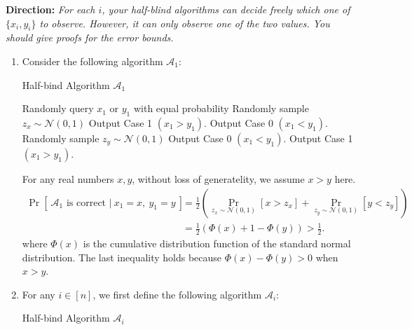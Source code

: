 \textbf{Direction:} \textit{For each $i$, your half-blind algorithms can decide freely which one of $\{x_i, y_i\}$ to observe. However, it can only observe one of the two values. You should give proofs for the error bounds.}

\newpage
\begin{answer}
\begin{enumerate}[label=\alph*).]
    \item Consider the following algorithm $\mathcal{A}_1$:
    \begin{algo}
        \caption{Half-bind Algorithm $\mathcal{A}_1$}
        \label{alg:half-blind-1}
        \begin{algorithmic}[1]
            \State Randomly query $x_1$ or $y_1$ with equal probability
                \State Randomly sample $z_x \sim \mathcal{N}(0,1)$
                    \State Output Case 1 $(x_1 > y_1)$.
                \Else
                    \State Output Case 0 $(x_1 < y_1)$.
                \EndIf
            \Else
                \State Randomly sample $z_y \sim \mathcal{N}(0,1)$
                    \State Output Case 0 $(x_1 < y_1)$.
                \Else
                    \State Output Case 1 $(x_1 > y_1)$.
                \EndIf
            \EndIf
        \end{algorithmic}
    \end{algo}
    For any real numbers $x, y$, without loss of generatelity, we assume $x > y$ here.
    \begin{align*}
        \Pr\left[\ \mathcal{A}_1\text{ is correct } | \ x_1 = x, \  y_1 = y \ \right] &= \frac{1}{2} \left(\Pr_{z_x\sim \mathcal{N}(0,1)}[x > z_x] + \Pr_{z_y\sim \mathcal{N}(0,1)}[y < z_y]\right) \\
        &= \frac{1}{2}\left(\Phi(x) + 1 - \Phi(y)\right)  > \frac{1}{2}.
    \end{align*}
    where $\Phi(x)$ is the cumulative distribution function of the standard normal distribution. The last inequality holds because $\Phi(x) - \Phi(y) > 0$ when $x > y$.
    \item For any $i \in [n]$, we first define the following algorithm $\mathcal{A}_i$:
    \begin{algo}
        \caption{Half-bind Algorithm $\mathcal{A}_i$}
        \label{alg:half-blind-i}
        \begin{algorithmic}[1]

\end{algorithmic}
\end{algo}
\end{enumerate}
\end{answer}
